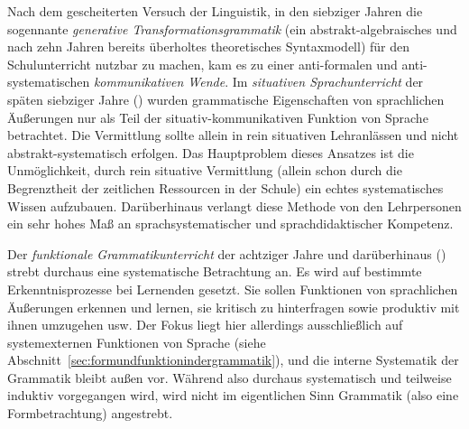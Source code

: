 Nach dem gescheiterten Versuch der Linguistik, in den siebziger Jahren die sogennante \textit{generative Transformationsgrammatik} (ein abstrakt-algebraisches und nach zehn Jahren bereits überholtes theoretisches Syntaxmodell) für den Schulunterricht nutzbar zu machen, kam es zu einer anti-formalen und anti-systematischen \textit{kommunikativen Wende}.
Im \textit{situativen Sprachunterricht} der späten siebziger Jahre (\citealt[229--232]{Bredel2013,BoettcherSitta1978}) wurden grammatische Eigenschaften von sprachlichen Äußerungen nur als Teil der situativ-kommunikativen Funktion von Sprache betrachtet.
Die Vermittlung sollte allein in rein situativen Lehranlässen und nicht abstrakt-systematisch erfolgen.
Das Hauptproblem dieses Ansatzes ist die Unmöglichkeit, durch rein situative Vermittlung (allein schon durch die Begrenztheit der zeitlichen Ressourcen in der Schule) ein echtes systematisches Wissen aufzubauen.
Darüberhinaus verlangt diese Methode von den Lehrpersonen ein sehr hohes Maß an sprachsystematischer und sprachdidaktischer Kompetenz.

Der \textit{funktionale Grammatikunterricht} der achtziger Jahre und darüberhinaus (\citealt[233--239]{Bredel2013,Koeller1997}) strebt durchaus eine systematische Betrachtung an.
Es wird auf bestimmte Erkenntnisprozesse bei Lernenden gesetzt.
Sie sollen Funktionen von sprachlichen Äußerungen erkennen und lernen, sie kritisch zu hinterfragen sowie produktiv mit ihnen umzugehen usw.
Der Fokus liegt hier allerdings ausschließlich auf systemexternen Funktionen von Sprache (siehe Abschnitt~\ref{sec:formundfunktionindergrammatik}), und die interne Systematik der Grammatik bleibt außen vor.
Während also durchaus systematisch und teilweise induktiv vorgegangen wird, wird nicht im eigentlichen Sinn Grammatik (also eine Formbetrachtung) angestrebt.

